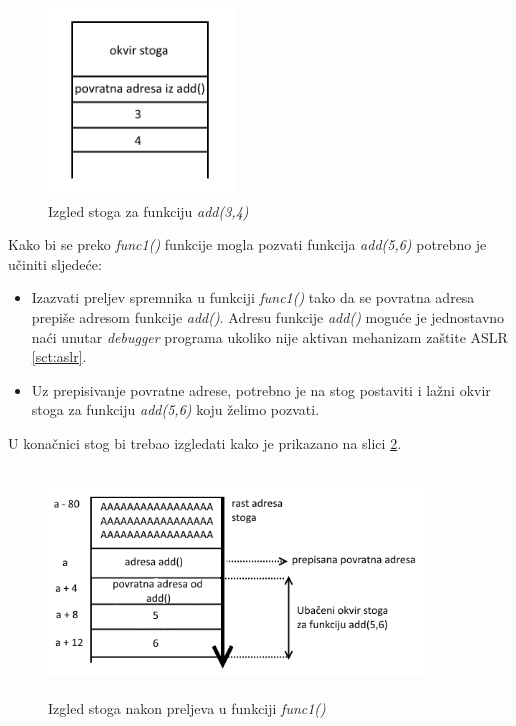 \documentclass[times, utf8, diplomski, numeric]{fer}
\begin{document}
\begin{figure}[!htb]
\centering
\setlength\fboxsep{0pt}
\setlength\fboxrule{0.5pt}
\includegraphics[width=5cm, height=5cm]{slike/rop_add34}
\caption{Izgled stoga za funkciju \emph{add(3,4)}}
\label{fig:rop_add34} 
\end{figure}
Kako bi se preko \emph{func1()} funkcije mogla pozvati funkcija \emph{add(5,6)} potrebno je učiniti sljedeće:
\begin{itemize}
\item Izazvati preljev spremnika u funkciji \emph{func1()} tako da se povratna adresa prepiše adresom funkcije \emph{add()}. Adresu funkcije \emph{add()} moguće je jednostavno naći unutar \emph{debugger} programa ukoliko nije aktivan mehanizam zaštite ASLR \ref{sct:aslr}.
\item Uz prepisivanje povratne adrese, potrebno je na stog postaviti i lažni okvir stoga za funkciju \emph{add(5,6)} koju želimo pozvati.
\end{itemize}

U konačnici stog bi trebao izgledati kako je prikazano na slici \ref{fig:rop_add56}.

\begin{figure}[!htb]
\centering
\setlength\fboxsep{0pt}
\setlength\fboxrule{0.5pt}
\includegraphics[width=10cm, height=6cm]{slike/rop_add56}
\caption{Izgled stoga nakon preljeva u funkciji \emph{func1()}}
\label{fig:rop_add56} 
\end{figure}
\end{document}

